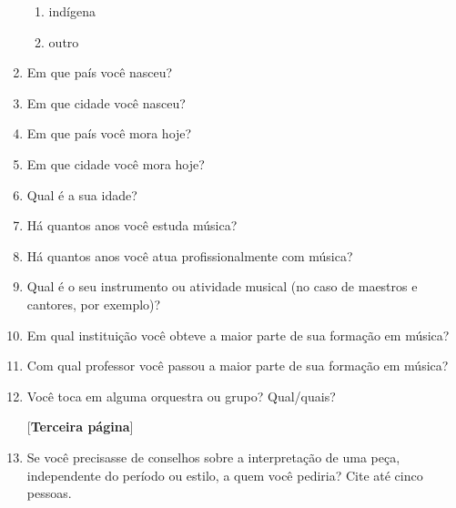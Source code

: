 \documentclass[a4paper, 12pt, openright, oneside, german, french, english, brazil]{abntex2}
\begin{document}
\begin{enumerate}
\begin{enumerate}
			\item indígena

			\item outro

		\end{enumerate}

		\item Em que país você nasceu?



		\item Em que cidade você nasceu?



		\item Em que país você mora hoje?



		\item Em que cidade você mora hoje?



		\item Qual é a sua idade?



		\item Há quantos anos você estuda música?



		\item Há quantos anos você atua profissionalmente com música?



		\item Qual é o seu instrumento ou atividade musical (no caso de maestros e cantores, por exemplo)?



		\item Em qual instituição você obteve a maior parte de sua formação em música?



		\item Com qual professor você passou a maior parte de sua formação em música?



		\item Você toca em alguma orquestra ou grupo? Qual/quais?





		[\textbf{Terceira página}]



		\item Se você precisasse de conselhos sobre a interpretação de uma peça, independente do período ou estilo, a quem você pediria? Cite até cinco pessoas.




\end{enumerate}
\end{document}
